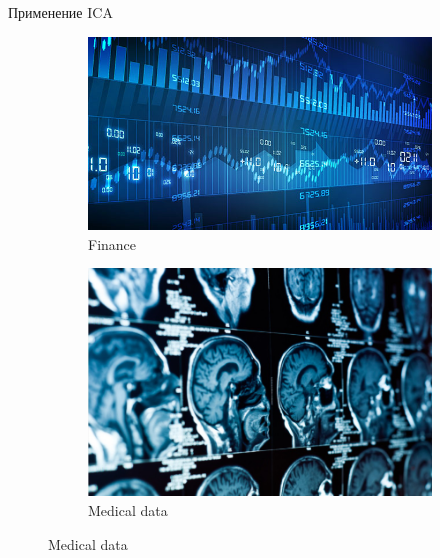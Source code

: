 \documentclass[10pt]{beamer}
\begin{document}
\begin{frame}{Применение ICA}
\begin{figure}
    \begin{subfigure}[b]{0.4\textwidth}
        \includegraphics[width=\textwidth]{images/finance.jpg}
        \caption{Finance}
    \end{subfigure}
    \begin{subfigure}[b]{0.4\textwidth}
        \includegraphics[width=\textwidth]{images/meddata.jpg}
        \caption{Medical data}
    \end{subfigure}
\end{figure}
\end{frame}
\end{document}
